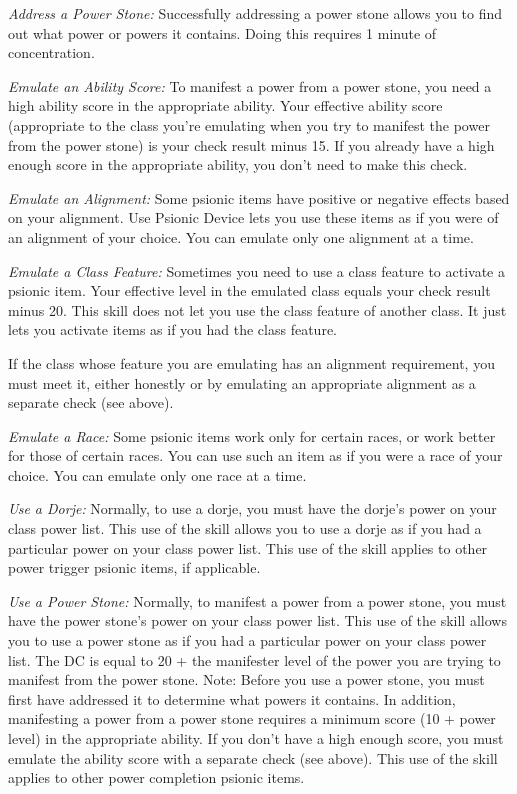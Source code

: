 \textit{Address a Power Stone:} Successfully addressing a power stone allows you to find out what power or powers it contains. Doing this requires 1 minute of concentration.

\textit{Emulate an Ability Score:} To manifest a power from a power stone, you need a high ability score in the appropriate ability. Your effective ability score (appropriate to the class you're emulating when you try to manifest the power from the power stone) is your check result minus 15. If you already have a high enough score in the appropriate ability, you don't need to make this check.

\textit{Emulate an Alignment:} Some psionic items have positive or negative effects based on your alignment. Use Psionic Device lets you use these items as if you were of an alignment of your choice. You can emulate only one alignment at a time.

\textit{Emulate a Class Feature:} Sometimes you need to use a class feature to activate a psionic item. Your effective level in the emulated class equals your check result minus 20. This skill does not let you use the class feature of another class. It just lets you activate items as if you had the class feature.

If the class whose feature you are emulating has an alignment requirement, you must meet it, either honestly or by emulating an appropriate alignment as a separate check (see above).

\textit{Emulate a Race:} Some psionic items work only for certain races, or work better for those of certain races. You can use such an item as if you were a race of your choice. You can emulate only one race at a time.

\textit{Use a Dorje:} Normally, to use a dorje, you must have the dorje's power on your class power list. This use of the skill allows you to use a dorje as if you had a particular power on your class power list. This use of the skill applies to other power trigger psionic items, if applicable.

\textit{Use a Power Stone:} Normally, to manifest a power from a power stone, you must have the power stone's power on your class power list. This use of the skill allows you to use a power stone as if you had a particular power on your class power list. The DC is equal to 20 + the manifester level of the power you are trying to manifest from the power stone. Note: Before you use a power stone, you must first have addressed it to determine what powers it contains. In addition, manifesting a power from a power stone requires a minimum score (10 + power level) in the appropriate ability. If you don't have a high enough score, you must emulate the ability score with a separate check (see above). This use of the skill applies to other power completion psionic items.

